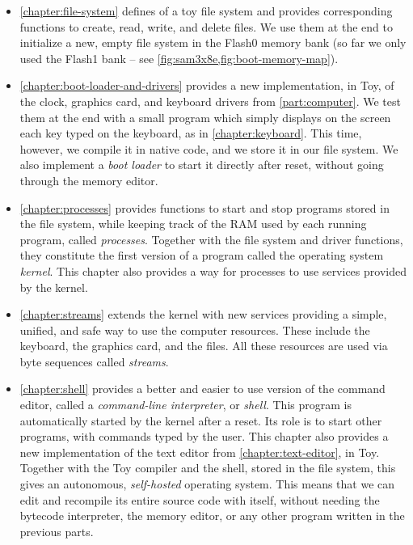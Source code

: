 \begin{itemize}
\item \cref{chapter:file-system} defines of a toy file system and provides
corresponding functions to create, read, write, and delete files. We use
them at the end to initialize a new, empty file system in the Flash0 memory
bank (so far we only used the Flash1 bank -- see
\cref{fig:sam3x8e,fig:boot-memory-map}).

\item \cref{chapter:boot-loader-and-drivers} provides a new implementation, in
Toy, of the clock, graphics card, and keyboard drivers from
\cref{part:computer}. We test them at the end with a small program which simply
displays on the screen each key typed on the keyboard, as in
\cref{chapter:keyboard}. This time, however, we compile it in native code, and
we store it in our file system. We also implement a {\em boot loader} to start
it directly after reset, without going through the memory editor.

\item \cref{chapter:processes} provides functions to start and stop programs
stored in the file system, while keeping track of the RAM used by each running
program, called {\em processes}. Together with the file system and driver
functions, they constitute the first version of a program called the operating
system {\em kernel}. This chapter also provides a way for processes to use
services provided by the kernel.

\item \cref{chapter:streams} extends the kernel with new services providing a
simple, unified, and safe way to use the computer resources. These include the
keyboard, the graphics card, and the files. All these resources are
used via byte sequences called {\em streams}.

\item \cref{chapter:shell} provides a better and easier to use version of the
command editor, called a {\em command-line interpreter}, or {\em shell}. This
program is automatically started by the kernel after a reset. Its role is to
start other programs, with commands typed by the user. This chapter also
provides a new implementation of the text editor from
\cref{chapter:text-editor}, in Toy. Together with the Toy compiler and the
shell, stored in the file system, this gives an autonomous, {\em self-hosted}
operating system. This means that we can edit and recompile its entire source
code with itself, without needing the bytecode interpreter, the memory editor,
or any other program written in the previous parts.


\end{itemize}
